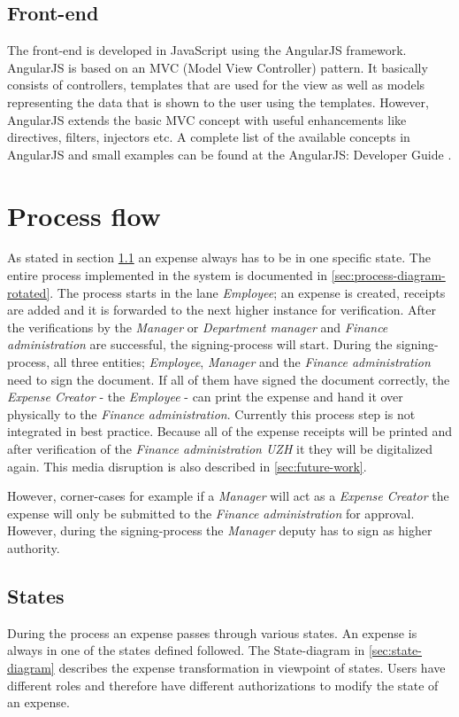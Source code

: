 \subsection{Front-end}
The front-end is developed in JavaScript using the AngularJS framework\cite{angular}. AngularJS is based on an MVC (Model View Controller) pattern. It basically consists of controllers, templates that are used for the view  as well as models representing the data that is shown to the user using the templates. However, AngularJS  extends the basic MVC concept with useful enhancements like directives, filters, injectors etc. A complete list of the available concepts in AngularJS and small examples can be found at the AngularJS: Developer Guide \cite{angular-devguide}.


\section{Process flow}
\label{sec:processflow}
As stated in section \ref{sec:states} an expense always has to be in one specific state. The entire process implemented in the system is documented in \ref{sec:process-diagram-rotated}.\newline
The process starts in the lane \textit{Employee}; an expense is created, receipts are added and it is forwarded to the next higher instance for verification. After the verifications by the \textit{Manager} or \textit{Department manager} and \textit{Finance administration} are successful, the signing-process will start. During the signing-process, all three entities; \textit{Employee}, \textit{Manager} and the \textit{Finance administration} need to sign the document. If all of them have signed the document correctly, the \textit{Expense Creator} - the \textit{Employee} - can print the expense and hand it over physically to the \textit{Finance administration}. Currently this process step is not integrated in best practice. Because all of the expense receipts will be printed and after verification of the \textit{Finance administration UZH} it they will be digitalized again. This media disruption is also described in \ref{sec:future-work}.\par
However, corner-cases for example if a \textit{Manager} will act as a \textit{Expense Creator} the expense will only be submitted to the \textit{Finance administration} for approval. However, during the signing-process the \textit{Manager} deputy has to sign as higher authority.

\subsection{States}
\label{sec:states}
During the process an expense passes through various states. An expense is always in one of the states defined followed. The State-diagram in \ref{sec:state-diagram} describes the expense transformation in viewpoint of states. Users have different roles and therefore have different authorizations to modify the state of an expense.

